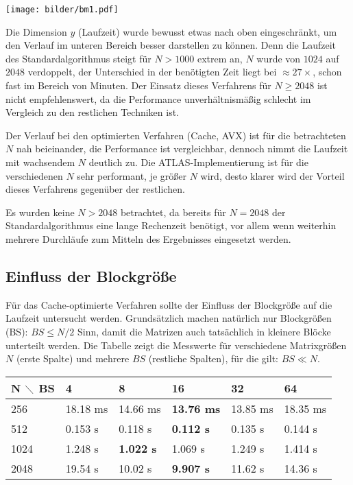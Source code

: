 \documentclass[a4paper,11pt]{scrartcl}
\begin{document}
\begin{center}
\texttt{[image: bilder/bm1.pdf]}
\end{center}

Die Dimension $y$ (Laufzeit) wurde bewusst etwas nach oben eingeschränkt, um den Verlauf
im unteren Bereich besser darstellen zu können. Denn die Laufzeit des Standardalgorithmus 
steigt für $N>1000$ extrem an, $N$ wurde von $1024$ auf $2048$ verdoppelt, 
der Unterschied in der benötigten Zeit liegt bei $\approx 27\times$, schon fast im Bereich von
Minuten. Der Einsatz dieses
Verfahrens für $N \geq 2048 $ ist nicht empfehlenswert, da die Performance un­ver­hält­nis­mä­ßig schlecht im Vergleich zu den restlichen Techniken ist.\newline

Der Verlauf bei den optimierten Verfahren (Cache, AVX) ist für die betrachteten $N$ nah beieinander,
die Performance ist vergleichbar, dennoch nimmt die Laufzeit mit wachsendem $N$ deutlich zu.
Die ATLAS-Implementierung ist für die verschiedenen $N$ sehr performant, je größer $N$ wird, desto
klarer wird der Vorteil dieses Verfahrens gegenüber der restlichen.\newline

Es wurden keine $N>2048$ betrachtet, da bereits für $N=2048$ 
der Standardalgorithmus eine lange Rechenzeit benötigt, vor allem wenn weiterhin mehrere
Durchläufe zum Mitteln des Ergebnisses eingesetzt werden.


\subsection{Einfluss der Blockgröße}\label{chp:BS}
Für das Cache-optimierte Verfahren sollte der Einfluss der Blockgröße auf die Laufzeit
untersucht werden. Grundsätzlich machen natürlich nur Blockgrößen (BS): $BS \leq N/2$
Sinn, damit die Matrizen auch tatsächlich in kleinere Blöcke unterteilt werden.
Die Tabelle zeigt die Messwerte für verschiedene Matrixgrößen $N$ (erste Spalte)
und mehrere $BS$ (restliche Spalten), für die gilt: $BS \ll N$.

\begin{center}
\begin{tabular}{| l | l | l | l | l | l |}
\hline
N $\diagdown$ BS & 4 & 8 & 16 & 32 & 64  \\ \hline

256 & 18.18 ms & 14.66 ms & \textbf{13.76 ms} & 13.85 ms & 18.35 ms  \\ \hline
512 & 0.153 s & 0.118 s & \textbf{0.112 s} & 0.135 s & 0.144 s  \\ \hline
1024 & 1.248 s & \textbf{1.022 s} & 1.069 s & 1.249 s & 1.414 s  \\ \hline
2048 & 19.54 s & 10.02 s & \textbf{9.907 s} & 11.62 s & 14.36 s  \\ \hline
\end{tabular}
\end{center}
\end{document}
